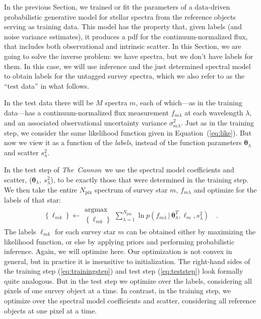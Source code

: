 \documentclass[12pt, preprint]{aastex}
\newcommand{\sectionname}{Section}
\newcommand{\tc}{\textsl{The~Cannon}}
\newcommand{\set}[1]{\bm{#1}}
\newcommand{\starlabel}{\ell}
\newcommand{\starlabelvec}{\set{\starlabel}}
\newcommand{\given}{\,|\,}
\newcommand{\pix}{\mathrm{pix}}
\begin{document}
In the previous Section, we trained or fit the parameters of
a data-driven probabilistic generative model for stellar spectra from the reference objects
serving as training data.
This model has the property that, given labels (and noise variance estimates), it produces a
pdf for the continuum-normalized flux, that includes both observational and intrinsic
scatter.
In this \sectionname, we are going to solve the inverse problem:
we have spectra, but we don't have labels for them.
In this case, we will use inference and the just determined spectral model
to obtain labels for the untagged survey
spectra, which we also refer to as the ``test data'' in what follows. 

In the test data there will be $M$ spectra $m$, each of which---as in
the training data---has a continuum-normalized flux measurement
$f_{m\lambda}$ at each wavelength $\lambda$, and an
associated observational uncertainty variance $\sigma_{m\lambda}^2$.
Just as in the training step, we consider the same likelihood function given in
Equation~(\ref{eq:like}). But now we view it as a function of the \emph{labels},
instead of the function parameters $\set{\theta}_\lambda$ and
scatter $s_\lambda^2$.

In the test step of \tc\ we use the spectral model coefficients and scatter,
($\set{\theta}_\lambda,\ s_\lambda^2$), to be exactly those that were determined in the training step.
We then take the entire $N_\pix$ spectrum of survey star $m$, $f_{m\lambda}$ and optimize for the labels of that star:
\begin{eqnarray}
\left\{\starlabel_{mk}\right\} \leftarrow \substack{\mbox{argmax}\\{\left\{\starlabel_{mk}\right\}}}
\sum_{\lambda=1}^{N_\pix}
\ln p(f_{m\lambda}\given\set{\theta}^T_\lambda, \starlabelvec_m, s_\lambda^2)
\label{eq:teststep}\quad .
\end{eqnarray}
The labels $\starlabel_{mk}$ for each survey star $m$ can be obtained either by maximizing
the likelihood function, or else by applying priors
and performing probabilistic inference.
Again, we will optimize here. Our optimization is not convex in general, but in practice it is insensitive to initialization.
The right-hand sides of the training step (\ref{eq:trainingstep}) and test step (\ref{eq:teststep}) look formally quite analogous.
But in the test step we optimize over the labels, considering all pixels of one survey object at a time. In contrast,
in the training step, we optimize over the spectral model coefficients and scatter, considering all reference objects
at one pixel at a time.
\end{document}
